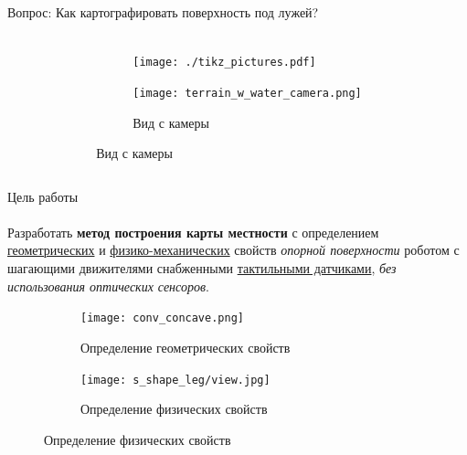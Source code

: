 \begin{frame}[t]{Вопрос: Как картографировать поверхность под лужей?}
    \framesubtitle{}
    \vspace{-1cm}
    \begin{columns}[T,onlytextwidth]
        \begin{column}{0.44\textwidth}
        \end{column}
        \begin{column}{0.44\textwidth}
            \begin{figure}[H]
                \begin{subfigure}[b]{0.9\textwidth}
                    \centering
                    \centering\texttt{[image: ./tikz\_pictures.pdf]}
                \end{subfigure}

                \begin{subfigure}{0.8\textwidth}
                    \centering\texttt{[image: terrain\_w\_water\_camera.png]}
                    \caption*{Вид с камеры}
                \end{subfigure}
            \end{figure}
        \end{column}
    \end{columns}
\end{frame}

\begin{frame}[t]{Цель работы}
    \framesubtitle{}
    Разработать \textbf{метод построения карты местности} с определением \underline{геометрических} и \underline{физико-механических} свойств \textit{опорной поверхности} роботом с шагающими движителями снабженными \underline{тактильными датчиками}, \textit{без использования оптических сенсоров}.
    \begin{figure}[H]
        \begin{subfigure}{0.49\textwidth}
            \centering\texttt{[image: conv\_concave.png]}
            \caption*{Определение геометрических свойств}
        \end{subfigure}
        \begin{subfigure}{0.49\textwidth}
            \centering\texttt{[image: s\_shape\_leg/view.jpg]}
            \caption*{Определение физических свойств}
        \end{subfigure}
    \end{figure}
\end{frame}

